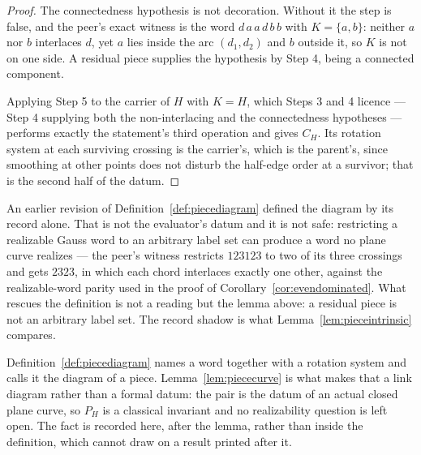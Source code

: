 \begin{proof}
The connectedness hypothesis is not decoration. Without it the step is false,
and the peer's exact witness is the word $d\,a\,a\,d\,b\,b$ with
$K=\{a,b\}$: neither $a$ nor $b$ interlaces $d$, yet $a$ lies inside the arc
$(d_1,d_2)$ and $b$ outside it, so $K$ is not on one side. A residual piece
supplies the hypothesis by Step 4, being a connected component.

Applying Step 5 to the carrier of $H$ with $K=H$, which Steps 3 and 4
licence --- Step 4 supplying both the non-interlacing and the connectedness
hypotheses --- performs exactly the statement's third operation and gives
$C_H$. Its rotation system at each surviving crossing is the carrier's,
which is the parent's, since smoothing at other points does not disturb the
half-edge order at a survivor; that is the second half of the datum.
\end{proof}

\begin{remark}
\label{rem:piecedatum}
An earlier revision of Definition~\ref{def:piecediagram} defined the diagram by
its record alone. That is not the evaluator's datum and it is not safe:
restricting a realizable Gauss word to an arbitrary label set can produce a word
no plane curve realizes --- the peer's witness restricts $123123$ to two of its
three crossings and gets $2323$, in which each chord interlaces exactly one
other, against the realizable-word parity used in the proof of
Corollary~\ref{cor:evendominated}. What rescues the
definition is not a reading but the lemma above: a residual piece is not an
arbitrary label set. The record shadow is what Lemma~\ref{lem:pieceintrinsic}
compares.

Definition~\ref{def:piecediagram} names a word together with a rotation system
and calls it the diagram of a piece. Lemma~\ref{lem:piececurve} is what makes
that a link diagram rather than a formal datum: the pair is the datum of an
actual closed plane curve, so $P_H$ is a classical invariant and no
realizability question is left open. The fact is recorded here, after the lemma,
rather than inside the definition, which cannot draw on a result printed after
it.
\end{remark}

